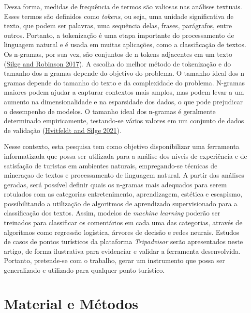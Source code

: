 \documentclass[preprint, 3p,
authoryear]{elsarticle} %
\begin{document}
Dessa forma, medidas de frequência de termos são valiosas nas análises
textuais. Esses termos são definidos como \emph{tokens}, ou seja, uma
unidade significativa de texto, que podem ser palavras, uma sequência
delas, frases, parágrafos, entre outros. Portanto, a tokenização é uma
etapa importante do processamento de linguagem natural e é usada em
muitas aplicações, como a classificação de textos. Os n-gramas, por sua
vez, são conjuntos de n tokens adjacentes em um texto
(\protect\hyperlink{ref-Silge2017}{Silge and Robinson 2017}). A escolha
do melhor método de tokenização e do tamanho dos n-gramas depende do
objetivo do problema. O tamanho ideal dos n-gramas depende do tamanho do
texto e da complexidade do problema. N-gramas maiores podem ajudar a
capturar contextos mais amplos, mas podem levar a um aumento na
dimensionalidade e na esparsidade dos dados, o que pode prejudicar o
desempenho de modelos. O tamanho ideal dos n-gramas é geralmente
determinado empiricamente, testando-se vários valores em um conjunto de
dados de validação (\protect\hyperlink{ref-Hvitfeldt2021}{Hvitfeldt and
Silge 2021}).

Nesse contexto, esta pesquisa tem como objetivo disponibilizar uma
ferramenta informatizada que possa ser utilizada para a análise dos
níveis de experiência e de satisfação de turistas em ambientes naturais,
empregando-se técnicas de mineraçao de textos e processamento de
linguagem natural. A partir das análises geradas, será possível definir
quais os n-gramas mais adequados para serem rotulados com as categorias
entretenimento, aprendizagem, estética e escapismo, possibilitando a
utilização de algoritmos de aprendizado supervisionado para a
classificação dos textos. Assim, modelos de \emph{machine learning}
poderão ser treinados para classificar os comentários em cada uma das
categorias, através de algoritmos como regressão logística, árvores de
decisão e redes neurais. Estudos de casos de pontos turísticos da
plataforma \emph{Tripadvisor} serão apresentados neste artigo, de forma
ilustrativa para evidenciar e validar a ferramenta desenvolvida.
Portanto, pretende-se com o trabalho, gerar um instrumento que possa ser
generalizado e utilizado para qualquer ponto turístico.

\hypertarget{material-e-muxe9todos}{%
\section{Material e Métodos}\label{material-e-muxe9todos}}
\end{document}
